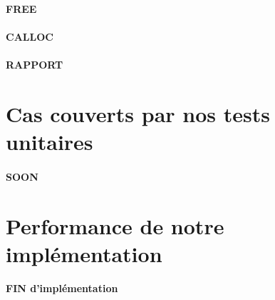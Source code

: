 \documentclass[10pt,a4paper]{article}
\begin{document}
\paragraph{FREE}


\paragraph{CALLOC}

\paragraph{RAPPORT}


\section{Cas couverts par nos tests unitaires}

\paragraph{SOON}


\section{Performance de notre implémentation}

\paragraph{FIN d'implémentation}


\end{document}

